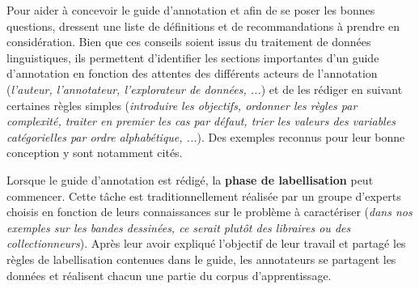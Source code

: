 			\begin{leftBarInformation}
				Pour aider à concevoir le guide d'annotation et afin de se poser les bonnes questions, \cite{dipper-etal:2004:useradaptive-annotation-guidelines} dressent une liste de définitions et de recommandations à prendre en considération.
				Bien que ces conseils soient issus du traitement de données linguistiques, ils permettent d'identifier les sections importantes d'un guide d'annotation en fonction des attentes des différents acteurs de l'annotation (\textit{l'auteur, l'annotateur, l'explorateur de données, ...}) et de les rédiger en suivant certaines règles simples (\textit{introduire les objectifs, ordonner les règles par complexité, traiter en premier les cas par défaut, trier les valeurs des variables catégorielles par ordre alphabétique, ...}).
				Des exemples reconnus pour leur bonne conception y sont notamment cités.
			\end{leftBarInformation}
			
			
			
			Lorsque le guide d'annotation est rédigé, la \textbf{phase de labellisation} peut commencer.
			Cette tâche est traditionnellement réalisée par un groupe d'experts choisis en fonction de leurs connaissances sur le problème à caractériser (\textit{dans nos exemples sur les bandes dessinées, ce serait plutôt des libraires ou des collectionneurs}).
			Après leur avoir expliqué l'objectif de leur travail et partagé les règles de labellisation contenues dans le guide, les annotateurs se partagent les données et réalisent chacun une partie du corpus d'apprentissage.
			
			
